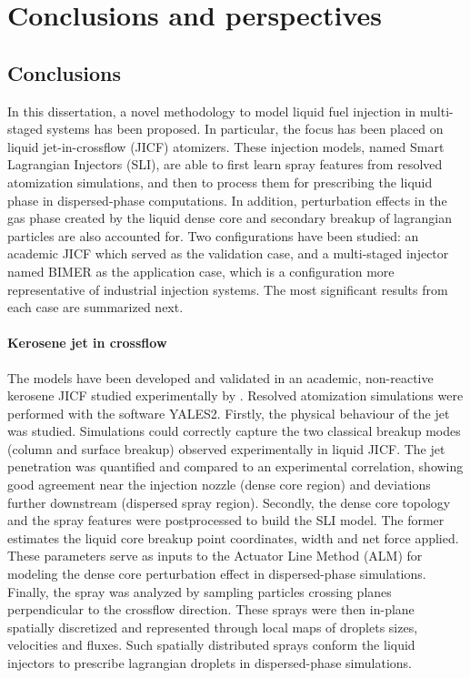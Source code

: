 \chapter{Conclusions and perspectives}

\section*{Conclusions}

In this dissertation, a novel methodology to model liquid fuel injection in multi-staged systems has been proposed. In particular, the focus has been placed on liquid jet-in-crossflow (JICF) atomizers. These injection models, named Smart Lagrangian Injectors (SLI), are able to first learn spray features from resolved atomization simulations, and then to process them for prescribing the liquid phase in dispersed-phase computations. In addition, perturbation effects in the gas phase created by the liquid dense core and secondary breakup of lagrangian particles are also accounted for. Two configurations have been studied: an academic JICF which served as the validation case, and a multi-staged injector named BIMER as the application case, which is a configuration more representative of industrial injection systems. The most significant results from each case are summarized next.


\subsubsection*{Kerosene jet in crossflow}

The models have been developed and validated in an academic, non-reactive kerosene JICF studied experimentally by . Resolved atomization simulations were performed with the software YALES2. Firstly, the physical behaviour of the jet was studied. Simulations could correctly capture the two classical breakup modes (column and surface breakup) observed experimentally in liquid JICF.  The jet penetration was quantified and compared to an experimental correlation, showing good agreement near the injection nozzle (dense core region) and deviations further downstream (dispersed spray region). Secondly, the dense core topology and the spray features were postprocessed to build the SLI model. The former estimates the liquid core breakup point coordinates, width and net force applied. These parameters serve as inputs to the Actuator Line Method (ALM) for modeling the dense core perturbation effect in dispersed-phase simulations. Finally, the spray was analyzed by sampling particles crossing planes perpendicular to the crossflow direction. These sprays were then in-plane spatially discretized and represented through local maps of droplets sizes, velocities and fluxes. Such spatially distributed sprays conform the liquid injectors to prescribe lagrangian droplets in dispersed-phase simulations. 


